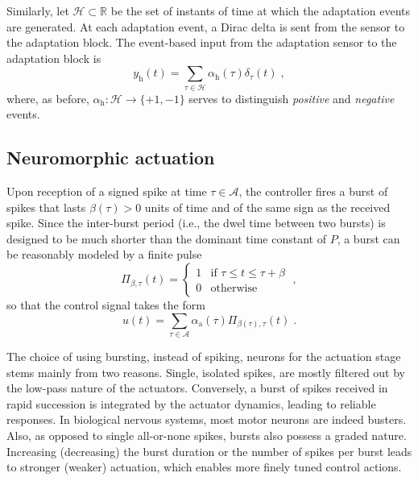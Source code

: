 \documentclass{article}
\newcommand{\AC}{\mathcal{A}}
\newcommand{\HH}{\mathcal{H}}
\newcommand{\RR}{\mathbb{R}}
\newcommand{\ra}{\mathrm{a}}
\newcommand{\rh}{\mathrm{h}}
\theoremstyle{definition}
\theoremstyle{remark}
\begin{document}
Similarly, let $\HH \subset \RR$ be the set of instants of time at which the adaptation events are generated. At each adaptation event, a Dirac delta is sent from the sensor to the adaptation block. The event-based input from the adaptation sensor to the adaptation block is
\begin{displaymath}
    y_\rh(t) = \sum_{\tau \in \HH}\alpha_\rh(\tau)\delta_{\tau}(t) \;,
\end{displaymath}
where, as before, $\alpha_\rh : \HH \to \{+1,-1\}$ serves to distinguish \emph{positive} and \emph{negative} events.

\subsection{Neuromorphic actuation}

Upon reception of a signed spike at time $\tau \in \AC$, the controller fires a burst of spikes that lasts $\beta(\tau) > 0$ units of time and of the same sign as the received spike. Since the inter-burst period (i.e., the dwel time between two bursts) is designed to be much shorter than the dominant time constant of $P$, a burst can be reasonably modeled by a finite pulse
\begin{displaymath}
    \Pi_{\beta,\tau}(t) =
    \begin{cases}
        1 & \text{if $\tau \le t \le \tau + \beta$} \\
        0 & \text{otherwise}
    \end{cases} \;,
\end{displaymath}
so that the control signal takes the form
\begin{equation} \label{eq:u}
    u(t) = \sum_{\tau \in \AC}\alpha_\ra(\tau)\Pi_{\beta(\tau),\tau}(t) \;.
\end{equation}

The choice of using bursting, instead of spiking, neurons for the actuation stage stems mainly from two reasons. Single, isolated spikes, are mostly filtered out by the low-pass nature of the actuators. Conversely, a burst of spikes received in rapid succession is integrated by the actuator dynamics, leading to reliable responses. In biological nervous systems, most motor neurons are indeed busters. Also, as opposed to single all-or-none spikes, bursts also possess a graded nature. Increasing (decreasing) the burst duration or the number of spikes per burst leads to stronger (weaker) actuation, which enables more finely tuned control actions.
\end{document}
